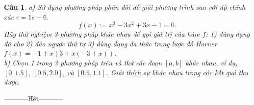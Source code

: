 \documentclass[11pt]{article}
\newtheorem{bt}{Câu}
\begin{document}
\begin{bt} %
a) Sử dụng phương pháp phân đôi để giải phương trình sau với độ chính xác $\epsilon=1e-6$. 
%
\[ f(x) := x^3-3x^2+3x-1 = 0. \]
%
Hãy thử nghiệm 3 phương pháp khác nhau để gọi giá trị của hàm $f$: 1) dùng dạng đã cho 2) đảo ngược thứ tự 3) dùng dạng đa thức trong lược đồ Horner $f(x) = -1+x(3+x(-3+x))$. \\
b) Chọn 1 trong 3 phương pháp trên và thử các đoạn $[a,b]$ khác nhau, ví dụ, $[0, 1.5]$, $[0.5, 2.0]$, và $[0.5, 1.1]$. Giải thích sự khác nhau trong các kết quả thu được. 
\end{bt}

\centerline{-----------Hết-----------}

% 
   
\end{document}
